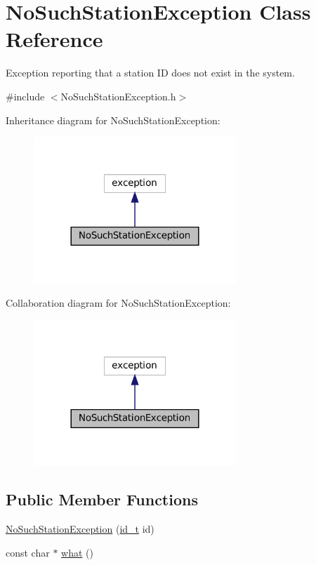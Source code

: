 \hypertarget{classNoSuchStationException}{}\section{No\+Such\+Station\+Exception Class Reference}
\label{classNoSuchStationException}


Exception reporting that a station ID does not exist in the system.  




{\ttfamily \#include $<$No\+Such\+Station\+Exception.\+h$>$}



Inheritance diagram for No\+Such\+Station\+Exception\+:
\nopagebreak
\begin{figure}[H]
\begin{center}
\leavevmode
\includegraphics[width=216pt]{classNoSuchStationException__inherit__graph}
\end{center}
\end{figure}


Collaboration diagram for No\+Such\+Station\+Exception\+:
\nopagebreak
\begin{figure}[H]
\begin{center}
\leavevmode
\includegraphics[width=216pt]{classNoSuchStationException__coll__graph}
\end{center}
\end{figure}
\subsection*{Public Member Functions}
\begin{DoxyCompactItemize}
\item 
\mbox{\hyperlink{classNoSuchStationException_a3e907e61f0836f6954f40bd63538bcb6}{No\+Such\+Station\+Exception}} (\mbox{\hyperlink{project__utils_8h_a8f3a969054ad2200720b96e7e23dd4e1}{id\+\_\+t}} id)
\item 
const char $\ast$ \mbox{\hyperlink{classNoSuchStationException_ab67522921093ac926cc70e2fb0a0730c}{what}} ()
\end{DoxyCompactItemize}



